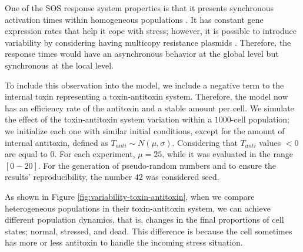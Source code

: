 \documentclass[a4paper, nobind]{templates/ociamthesis}
\begin{document}
One of the SOS response system properties is that it presents synchronous activation times within homogeneous populations \autocite{friedmanPreciseTemporalModulation2005}.
It has constant gene expression rates that help it cope with stress; however, it is possible to introduce variability by considering having multicopy resistance plasmids \autocite{million-weaverMechanismsPlasmidSegregation2014}.
Therefore, the response times would have an asynchronous behavior at the global level but synchronous at the local level.

To include this observation into the model, we include a negative term to the internal toxin representing a toxin-antitoxin system.
Therefore, the model now has an efficiency rate of the antitoxin and a stable amount per cell.
We simulate the effect of the toxin-antitoxin system variation within a \(1000\)-cell population; we initialize each one with similar initial conditions, except for the amount of internal antitoxin, defined as \(T_{anti} \sim N(\mu, \sigma)\).
Considering that \(T_{anti}\) values \(< 0\) are equal to \(0\).
For each experiment, \(\mu = 25\), while it was evaluated in the range \([0-20]\).
For the generation of pseudo-random numbers and to ensure the results' reproducibility, the number \(42\) was considered seed.

As shown in Figure \ref{fig:variability-toxin-antitoxin}, when we compare heterogeneous populations in their toxin-antitoxin system, we can achieve different population dynamics, that is, changes in the final proportions of cell states; normal, stressed, and dead.
This difference is because the cell sometimes has more or less antitoxin to handle the incoming stress situation.
\end{document}
